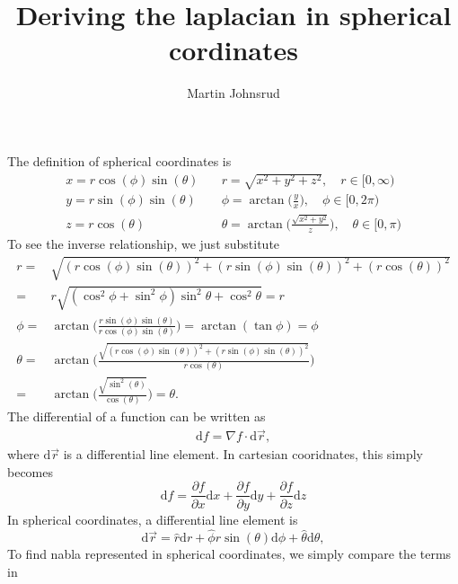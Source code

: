 \documentclass{article}
\title{Deriving the laplacian in spherical cordinates}
\author{Martin Johnsrud}
\begin{document}
    \maketitle
    The definition of spherical coordinates is
    \begin{align*}
        x = r \cos(\phi)\sin(\theta) \quad & r = \sqrt{x^2 + y^2  + z^2}, \quad r \in [0, \infty) \\
        y = r \sin(\phi)\sin(\theta) \quad & \phi = \arctan{\bigg( \frac{y}{x} \bigg)}, \quad \phi \in [0, 2 \pi)\\
        z = r \cos(\theta) \quad & \theta = \arctan{\bigg( \frac{\sqrt{x^2 + y^2}}{z} \bigg)}, \quad \theta \in [0, \pi)
    \end{align*} 
    To see the inverse relationship, we just substitute
    \begin{align*}
        r = &\sqrt{(r \cos(\phi)\sin(\theta))^2 + (r \sin(\phi)\sin(\theta))^2  + (r \cos(\theta) )^2} \\ 
        = &r \sqrt{(\cos^2{\phi} + \sin^2{\phi})\sin^2{\theta} + \cos^2{\theta}} = r \\ 
        \phi = &\arctan{\bigg( \frac{r \sin(\phi)\sin(\theta)}{r \cos(\phi)\sin(\theta)} \bigg)} = \arctan{(\tan{\phi})} = \phi \\
        \theta = & \arctan{\bigg( \frac{\sqrt{(r \cos(\phi)\sin(\theta) )^2 + (r \sin(\phi)\sin(\theta))^2}}{r \cos(\theta)} \bigg)} \\ =& \arctan{\bigg( \frac{\sqrt{\sin^2(\theta)}}{\cos(\theta)} \bigg)} = \theta.
    \end{align*}
    The differential of a function can be written as
    \begin{align*}
        \mathrm{d}f = \nabla f \cdot \mathrm{d}\vec r,    
    \end{align*}
    where \(\mathrm{d} \vec r\) is a differential line element. In cartesian cooridnates, this simply becomes
    \begin{equation*}
        \mathrm{d}f = \frac{\partial f}{\partial x} \mathrm{d}x + \frac{\partial f}{\partial y} \mathrm{d}y + \frac{\partial f}{\partial z} \mathrm{d}z
    \end{equation*}
    In spherical coordinates, a differential line element is 
    \begin{equation*}
        \mathrm{d} \vec r = \hat r \mathrm{d}r + \hat \phi r \sin(\theta) \mathrm{d} \phi + \hat \theta \mathrm{d} \theta,
    \end{equation*}
    To find nabla represented in spherical coordinates, we simply compare the terms in
\end{document}
